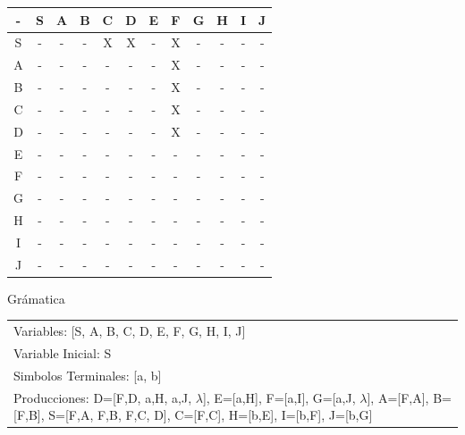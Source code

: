 \documentclass[a4paper,11pt]{article}
\newcommand{\MYp}[1]{ {\color[rgb]{0.392,0.392,0.392}#1} }
\begin{document}
\begin{center}
\begin{tabular}{||c||c||c||c||c||c||c||c||c||c||c||c||}
\hline
\hline
  -  & S & A & B & C & D & E & F & G & H & I & J \\ 
\hline
\hline
 S  &  -  &  -  &  -  &  X  &  X  &  -  &  X  &  -  &  -  &  -  &  -  \\ 
\hline
\hline
 A  &  -  &  -  &  -  &  -  &  -  &  -  &  X  &  -  &  -  &  -  &  -  \\ 
\hline
\hline
 B  &  -  &  -  &  -  &  -  &  -  &  -  &  X  &  -  &  -  &  -  &  -  \\ 
\hline
\hline
 C  &  -  &  -  &  -  &  -  &  -  &  -  &  X  &  -  &  -  &  -  &  -  \\ 
\hline
\hline
 D  &  -  &  -  &  -  &  -  &  -  &  -  &  X  &  -  &  -  &  -  &  -  \\ 
\hline
\hline
 E  &  -  &  -  &  -  &  -  &  -  &  -  &  -  &  -  &  -  &  -  &  -  \\ 
\hline
\hline
 F  &  -  &  -  &  -  &  -  &  -  &  -  &  -  &  -  &  -  &  -  &  -  \\ 
\hline
\hline
 G  &  -  &  -  &  -  &  -  &  -  &  -  &  -  &  -  &  -  &  -  &  -  \\ 
\hline
\hline
 H  &  -  &  -  &  -  &  -  &  -  &  -  &  -  &  -  &  -  &  -  &  -  \\ 
\hline
\hline
 I  &  -  &  -  &  -  &  -  &  -  &  -  &  -  &  -  &  -  &  -  &  -  \\ 
\hline
\hline
 J  &  -  &  -  &  -  &  -  &  -  &  -  &  -  &  -  &  -  &  -  &  -  \\ 
\hline
\hline
\end{tabular}
\end{center}
\MYp{\Huge Gr\'amatica}
\newline
\begin{center}\begin{tabular}{ m{15cm} }


Variables: [S, A, B, C, D, E, F, G, H, I, J] \\
Variable Inicial: S \\
Simbolos Terminales: [a, b] \\
Producciones: {D=[F,D, a,H, a,J, $\lambda$], E=[a,H], F=[a,I], G=[a,J, $\lambda$], A=[F,A], B=[F,B], S=[F,A, F,B, F,C, D], C=[F,C], H=[b,E], I=[b,F], J=[b,G]} \\

\end{tabular}
\end{center}
\end{document}
